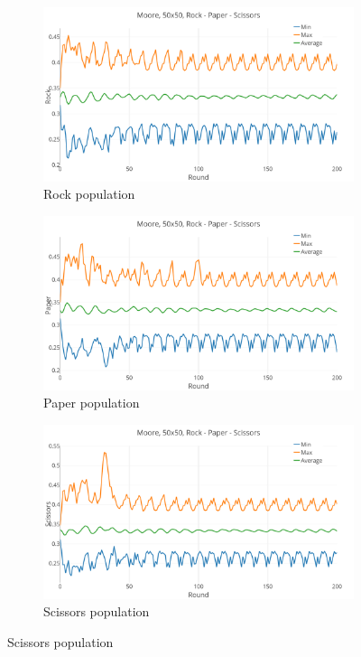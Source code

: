 \documentclass[a4paper, 11pt]{article}
\begin{document}
\begin{landscape}
\begin{figure}[H]
	\begin{subfigure}{0.53\textwidth}
		\includegraphics[width=1\linewidth]{50x50_EqualDist_Rock}
		\caption{Rock population}
	\end{subfigure}%
	\begin{subfigure}{0.53\textwidth}
		\includegraphics[width=1\linewidth]{50x50_EqualDist_Paper}
		\caption{Paper population}
	\end{subfigure}%
	\begin{subfigure}{0.53\textwidth}
		\includegraphics[width=1\linewidth]{50x50_EqualDist_Scissors}
		\caption{Scissors population}
	\end{subfigure}
\end{figure}


\end{landscape}
\end{document}
